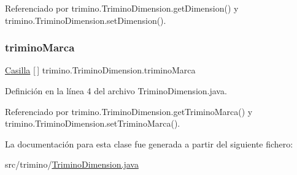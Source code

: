 Referenciado por trimino.\+Trimino\+Dimension.\+get\+Dimension() y trimino.\+Trimino\+Dimension.\+set\+Dimension().

\mbox{\label{classtrimino_1_1TriminoDimension_a579a30dc8a06363a2261246dd4bebb83}} 
\subsubsection{\texorpdfstring{triminoMarca}{triminoMarca}}
{\footnotesize\ttfamily \mbox{\hyperlink{classtrimino_1_1Casilla}{Casilla}} \mbox{[}$\,$\mbox{]} trimino.\+Trimino\+Dimension.\+trimino\+Marca\hspace{0.3cm}{\ttfamily [package]}}



Definición en la línea 4 del archivo Trimino\+Dimension.\+java.



Referenciado por trimino.\+Trimino\+Dimension.\+get\+Trimino\+Marca() y trimino.\+Trimino\+Dimension.\+set\+Trimino\+Marca().



La documentación para esta clase fue generada a partir del siguiente fichero\+:\begin{DoxyCompactItemize}
\item 
src/trimino/\mbox{\hyperlink{TriminoDimension_8java}{Trimino\+Dimension.\+java}}\end{DoxyCompactItemize}
